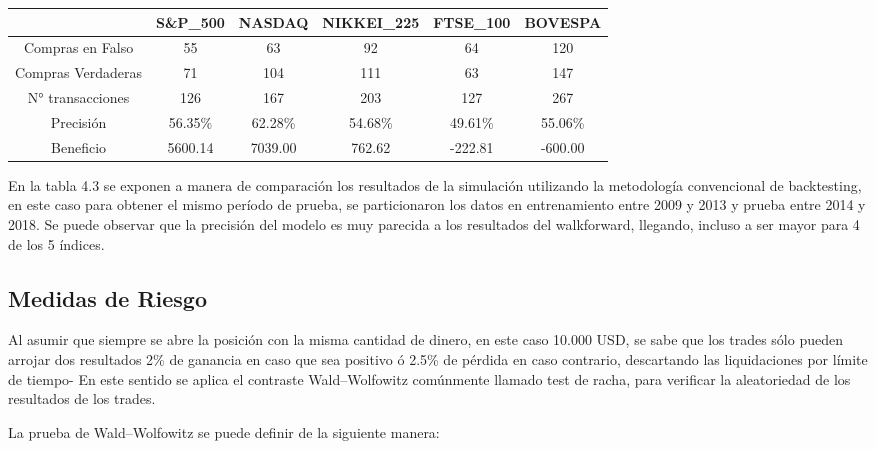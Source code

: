 \documentclass[a4paper,12pt]{Latex/Classes/PhDthesisPSnPDF}
\begin{document}
\begin{center}
\begin{table}[ht]
\centering
\begin{tabular}{cccccc}
  \hline
 & S\&P\_500 & NASDAQ & NIKKEI\_225 & FTSE\_100 & BOVESPA \\ 
  \hline
Compras en Falso & 55 & 63 & 92 & 64 & 120 \\ 
  Compras Verdaderas & 71 & 104 & 111 & 63 & 147 \\ 
  N° transacciones & 126 & 167 & 203 & 127 & 267 \\ 
  Precisión & 56.35\% & 62.28\% & 54.68\% & 49.61\% & 55.06\% \\ 
  Beneficio & 5600.14 & 7039.00 & 762.62 & -222.81 & -600.00 \\ 
   \hline
\end{tabular}
\end{table}\end{center}

En la tabla 4.3 se exponen a manera de comparación los resultados de la simulación utilizando la metodología convencional de backtesting, en este caso para obtener el mismo período de prueba, se particionaron los datos en entrenamiento entre 2009 y 2013 y prueba entre 2014 y 2018. Se puede observar que la precisión del modelo es muy parecida a los resultados del walkforward, llegando, incluso a ser mayor para 4 de los 5 índices. 

\subsection{Medidas de Riesgo}

Al asumir que siempre se abre la posición con la misma cantidad de dinero, en este caso 10.000 USD, se sabe que los trades sólo pueden arrojar dos resultados 2\% de ganancia en caso que sea positivo ó 2.5\% de pérdida en caso contrario, descartando las liquidaciones por límite de tiempo- En este sentido se aplica el contraste Wald–Wolfowitz comúnmente llamado test de racha, para verificar la aleatoriedad de los resultados de los trades.

La prueba de Wald–Wolfowitz se puede definir de la siguiente manera:
\end{document}
